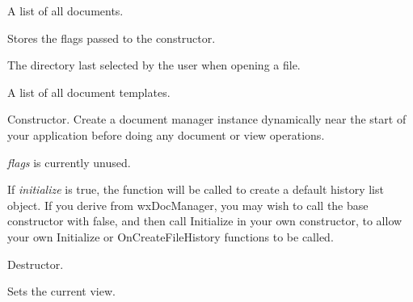 
A list of all documents.

\label{wxdocmanagermflags}


Stores the flags passed to the constructor.

\label{wxdocmanagermlastdirectory}

The directory last selected by the user when opening a file.


\label{wxdocmanagermtemplates}


A list of all document templates.

\label{wxdocmanagerctor}


Constructor. Create a document manager instance dynamically near the start of your application
before doing any document or view operations.

{\it flags} is currently unused.

If {\it initialize} is true, the  function will be called
to create a default history list object. If you derive from wxDocManager, you may wish to call the
base constructor with false, and then call Initialize in your own constructor, to allow
your own Initialize or OnCreateFileHistory functions to be called.

\label{wxdocmanagerdtor}


Destructor.

\label{wxdocmanageractivateview}


Sets the current view.

\label{wxdocmanageradddocument}


